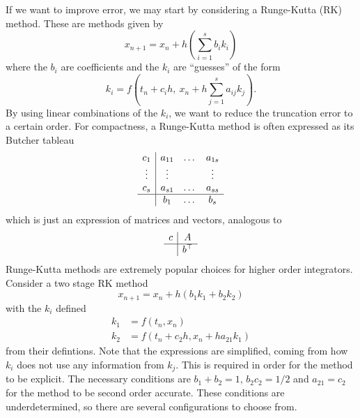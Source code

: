 If we want to improve error, we may start by considering a Runge-Kutta (RK) method.
These are methods given by
\begin{equation*}
	x_{n+1} = x_n + h \left( \sum_{i = 1}^{s} b_i k_i \right)
\end{equation*}
where the $b_i$ are coefficients and the $k_i$ are ``guesses'' of the form
\begin{equation*}
	k_i = f \left( t_n + c_i h,~ x_n + h\sum_{j = 1}^{s} a_{ij}k_j \right).	
\end{equation*}
By using linear combinations of the $k_i$, we want to reduce the truncation error to a certain order.
For compactness, a Runge-Kutta method is often expressed as its Butcher tableau
\begin{equation*}
	\begin{array}{c|ccc}
		c_1  &a_{11} &\dots &a_{1s} \\
		\vdots &\vdots & &\vdots \\
		c_s &a_{s1} &\dots &a_{ss} \\
		\hline
		&b_1 &\dots &b_s
	\end{array}
\end{equation*}
which is just an expression of matrices and vectors, analogous to
\begin{equation*}
    \begin{array}{c|c}
		c  &A \\
		\hline
		&b^\top
	\end{array}
\end{equation*}
Runge-Kutta methods are extremely popular choices for higher order integrators.
Consider a two stage RK method
\begin{equation*}
    x_{n+1} = x_n + h (b_1 k_1 + b_2 k_2)
\end{equation*}
with the $k_i$ defined
\begin{equation*}
    \begin{aligned}
        k_1 &= f \left( t_n, x_n \right) \\
        k_2 &= f \left( t_n + c_2 h, x_n + h a_{21}k_1 \right)
    \end{aligned}
\end{equation*}
from their defintions. Note that the expressions are simplified, coming from how $k_i$ does not use any information from $k_j$.
This is required in order for the method to be explicit.
The necessary conditions \cite{iserles2009rk} are $b_1 + b_2 = 1$, $b_2 c_2 = 1/2$ and $a_{21} = c_2$ for the method to be second order accurate.
These conditions are underdetermined, so there are several configurations to choose from.
